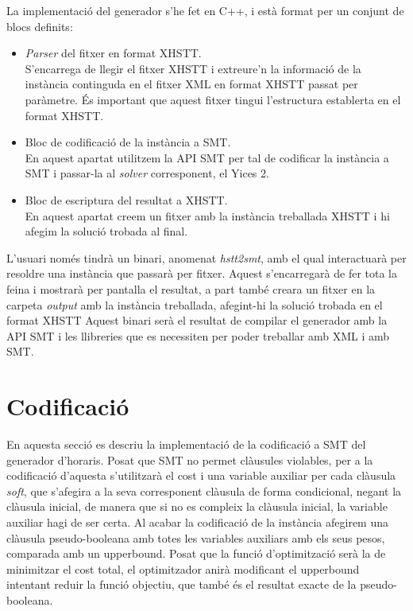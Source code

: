 \documentclass[11pt,a4paper,twoside]{report}
\begin{document}
  La implementació del generador s'he fet en C++, i està format per un conjunt de blocs definits:\
  \begin{itemize}
    \item \textit{Parser }del fitxer en format XHSTT. \\ S'encarrega de llegir el fitxer XHSTT i extreure'n la informació de la instància continguda en el fitxer XML en format XHSTT passat per paràmetre. És important que aquest fitxer tingui l'estructura establerta en el format XHSTT.
    \item Bloc de codificació de la instància a SMT. \\ En aquest apartat utilitzem la API SMT per tal de codificar la instància a SMT i passar-la al \textit{solver} corresponent, el Yices 2.
    \item Bloc de escriptura del resultat a XHSTT. \\ En aquest apartat creem un fitxer amb la instància treballada XHSTT i hi afegim la solució trobada al final.
  \end{itemize}

  L'usuari només tindrà un binari, anomenat \textit{hstt2smt}, amb el qual interactuarà per resoldre una instància que passarà per fitxer. Aquest s'encarregarà de fer tota la feina i mostrarà per pantalla el resultat, a part també creara un fitxer en la carpeta \textit{output} amb la instància treballada, afegint-hi la solució trobada en el format XHSTT
  Aquest binari serà el resultat de compilar el generador amb la API SMT i les llibreries que es necessiten per poder treballar amb XML i amb SMT.

  \section{Codificació}
  En aquesta secció es descriu la implementació de la codificació a SMT del generador d'horaris. 
  Posat que SMT no permet clàusules violables, per a la codificació d'aquesta s'utilitzarà el cost i una variable auxiliar per cada clàusula \textit{soft}, 
  que s'afegira a la seva corresponent clàusula de forma condicional, negant la clàusula inicial, de manera que si no es compleix la clàusula inicial, la variable auxiliar hagi de ser certa. Al acabar la codificació de la instància afegirem una clàusula pseudo-booleana amb totes les variables auxiliars amb els seus pesos, comparada amb un upperbound.
  Posat que la funció d'optimització serà la de minimitzar el cost total, el optimitzador anirà modificant el upperbound intentant reduir la funció objectiu, que també és el resultat exacte de la pseudo-booleana.
\end{document}
